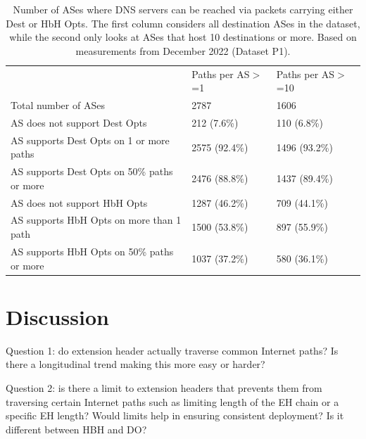 \documentclass[conference]{IEEEtran}
\begin{document}
    \begin{table}[]
\begin{tabular}{p{}|p{}p{}}
                                          & Paths per AS$>$=1 & Paths per AS$>$=10 \\ \cline{1-3} 
Total number of ASes                      & 2787                                            & 1606                                            \\ \hline
AS does not support Dest Opts               & 212 (7.6\%)                                     & 110 (6.8\%)                                     \\
AS supports Dest Opts on 1 or more paths   & 2575 (92.4\%)                                   & 1496 (93.2\%)                                   \\
AS supports Dest Opts on 50\% paths or more & 2476  (88.8\%)                                  & 1437 (89.4\%)                                   \\ \hline
AS does not support HbH Opts               & 1287 (46.2\%)                                   & 709 (44.1\%)                                    \\
AS supports HbH Opts on more than 1 path   & 1500 (53.8\%)                                   & 897 (55.9\%)                                    \\
AS supports HbH Opts on 50\% paths or more & 1037 (37.2\%)                                   & 580 (36.1\%)                                   
\end{tabular}
\label{tbl:as_pathspider}
\caption{Number of ASes where DNS servers can be reached via packets carrying either Dest or HbH Opts. The first column considers all destination ASes in the dataset, while the second only looks at ASes that host 10 destinations or more. Based on measurements from December 2022 (Dataset P1).}
\end{table}

\section{Discussion} 
\label{sec:discussion}

Question 1: do extension header actually traverse common Internet paths? Is there a longitudinal trend making this more easy or harder?


Question 2: is there a limit to extension headers that prevents them from traversing certain Internet paths such as limiting length of the EH chain or a specific EH length? Would limits help in ensuring consistent deployment? Is it different between HBH and DO?
\end{document}
